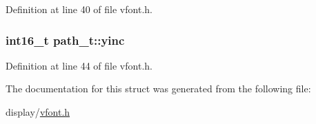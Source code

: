 Definition at line 40 of file vfont.\+h.

\subsubsection[{\texorpdfstring{yinc}{yinc}}]{\setlength{\rightskip}{0pt plus 5cm}int16\+\_\+t path\+\_\+t\+::yinc}\hypertarget{structpath__t_a224367f52f511bef405c7579240f55d1}{}\label{structpath__t_a224367f52f511bef405c7579240f55d1}


Definition at line 44 of file vfont.\+h.



The documentation for this struct was generated from the following file\+:\begin{DoxyCompactItemize}
\item 
display/\hyperlink{vfont_8h}{vfont.\+h}\end{DoxyCompactItemize}

